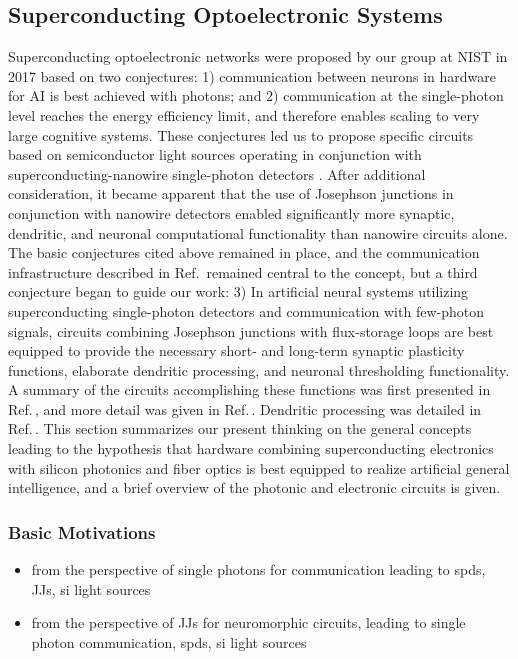 \subsection{\label{sec:superconducting_optoelectronic}Superconducting Optoelectronic Systems}
Superconducting optoelectronic networks were proposed by our group at NIST in 2017 based on two conjectures: 1) communication between neurons in hardware for AI is best achieved with photons; and 2) communication at the single-photon level reaches the energy efficiency limit, and therefore enables scaling to very large cognitive systems. These conjectures led us to propose specific circuits based on semiconductor light sources operating in conjunction with superconducting-nanowire single-photon detectors \cite{shbu2017}. After additional consideration, it became apparent that the use of Josephson junctions in conjunction with nanowire detectors enabled significantly more synaptic, dendritic, and neuronal computational functionality than nanowire circuits alone. The basic conjectures cited above remained in place, and the communication infrastructure described in Ref.\, remained central to the concept, but a third conjecture began to guide our work: 3) In artificial neural systems utilizing superconducting single-photon detectors and communication with few-photon signals, circuits combining Josephson junctions with flux-storage loops are best equipped to provide the necessary short- and long-term synaptic plasticity functions, elaborate dendritic processing, and neuronal thresholding functionality. A summary of the circuits accomplishing these functions was first presented in Ref.\,, and more detail was given in Ref.\,. Dendritic processing was detailed in Ref.\,. This section summarizes our present thinking on the general concepts leading to the hypothesis that hardware combining superconducting electronics with silicon photonics and fiber optics is best equipped to realize artificial general intelligence, and a brief overview of the photonic and electronic circuits is given.

\subsubsection{Basic Motivations}
\begin{itemize}
\item from the perspective of single photons for communication leading to spds, JJs, si light sources
\item from the perspective of JJs for neuromorphic circuits, leading to single photon communication, spds, si light sources
\end{itemize}

